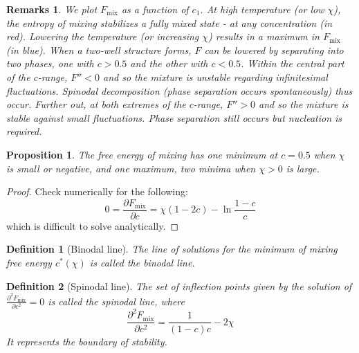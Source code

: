 \documentclass[a4paper]{article}
\newtheorem{remarks}{Remarks}[section]
\theoremstyle{new}
\newtheorem{defi}{Definition}[section]
\newtheorem{prop}{Proposition}[section]
\begin{document}
\begin{remarks}
We plot $F_{\text{mix}}$ as a function of $c_1$. At high temperature (or low $\chi$), the entropy of mixing stabilizes a fully mixed state - at any concentration (in red). Lowering the temperature (or increasing $\chi$) results in a maximum in $F_{\text{mix}}$ (in blue). When a two-well structure forms, $F$ can be lowered by separating into two phases, one with $c>0.5$ and the other with $c<0.5$. Within the central part of the $c$-range, $F''<0$ and so the mixture is unstable regarding infinitesimal fluctuations. Spinodal decomposition (phase separation occurs spontaneously) thus occur. Further out, at both extremes of the $c$-range, $F''>0$ and so the mixture is stable against small fluctuations. Phase separation still occurs but nucleation is required.
\begin{center}
\end{center}
\end{remarks}
\begin{prop}
The free energy of mixing has one minimum at $c=0.5$ when $\chi$ is small or negative, and one maximum, two minima when $\chi>0$ is large.
\end{prop}
\begin{proof}
Check numerically for the following:
$$0=\frac{\partial F_{\text{mix}}}{\partial c}=\chi(1-2c)-\ln\frac{1-c}{c}$$
which is difficult to solve analytically.
\end{proof}
\begin{defi}[Binodal line]
The line of solutions for the minimum of mixing free energy $c^*(\chi)$ is called the binodal line.
\end{defi}
\begin{defi}[Spinodal line]
The set of inflection points given by the solution of $\frac{\partial^2F_{\text{mix}}}{\partial c^2}=0$ is called the spinodal line, where
$$\frac{\partial^2F_{\text{mix}}}{\partial c^2}=\frac{1}{(1-c)c}-2\chi$$
It represents the boundary of stability.
\end{defi}
\end{document}
